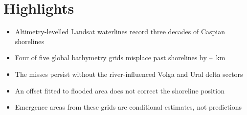 \documentclass[12pt]{article}
\begin{document}
\section*{Highlights}
\begin{itemize}
  \item Altimetry-levelled Landsat waterlines record three decades of Caspian shorelines
  \item Four of five global bathymetry grids misplace past shorelines by --~km
  \item The misses persist without the river-influenced Volga and Ural delta sectors
  \item An offset fitted to flooded area does not correct the shoreline position
  \item Emergence areas from these grids are conditional estimates, not predictions
\end{itemize}
\end{document}
